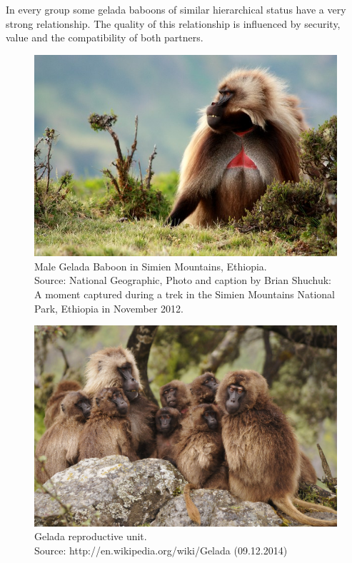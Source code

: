 \documentclass[11pt]{article}
\begin{document}
In every group some gelada baboons of similar hierarchical status have a very strong relationship. The quality of this relationship is influenced by security, value and the compatibility of both partners.\cite{Puga-Gonzalez2009} 
\begin{figure}[H]
\centering
\includegraphics[scale=0.4]{Photos/NationalGeographic_BrianShuchuk}
\caption[Male gelada baboon]{Male Gelada Baboon in Simien Mountains, Ethiopia.\\
Source: National Geographic, Photo and caption by Brian Shuchuk: A moment captured during a trek in the Simien Mountains National Park, Ethiopia in November 2012.}
\label{fig:MaleGelada}
\end{figure}

\begin{figure}[H]
\centering
\includegraphics[scale=0.55]{Photos/Gelada_group}
\caption[Gelada reproductive unit]{Gelada reproductive unit.\\ Source: http://en.wikipedia.org/wiki/Gelada (09.12.2014)}
\label{fig:GeladaGroup}
\end{figure}
\end{document}
